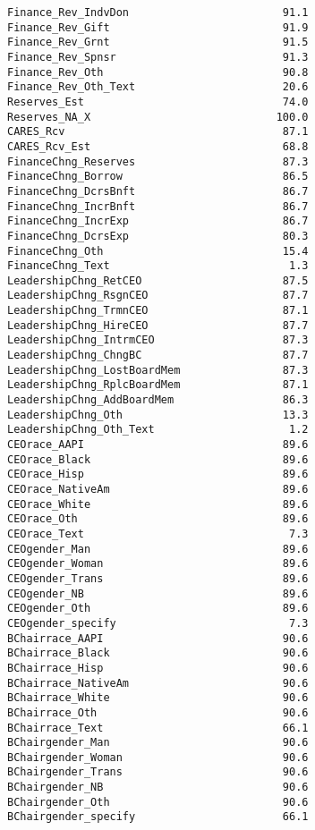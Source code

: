 \documentclass[
  letterpaper,
]{scrbook}
\begin{document}
\begin{verbatim}
Finance_Rev_IndvDon                        91.1
Finance_Rev_Gift                           91.9
Finance_Rev_Grnt                           91.5
Finance_Rev_Spnsr                          91.3
Finance_Rev_Oth                            90.8
Finance_Rev_Oth_Text                       20.6
Reserves_Est                               74.0
Reserves_NA_X                             100.0
CARES_Rcv                                  87.1
CARES_Rcv_Est                              68.8
FinanceChng_Reserves                       87.3
FinanceChng_Borrow                         86.5
FinanceChng_DcrsBnft                       86.7
FinanceChng_IncrBnft                       86.7
FinanceChng_IncrExp                        86.7
FinanceChng_DcrsExp                        80.3
FinanceChng_Oth                            15.4
FinanceChng_Text                            1.3
LeadershipChng_RetCEO                      87.5
LeadershipChng_RsgnCEO                     87.7
LeadershipChng_TrmnCEO                     87.1
LeadershipChng_HireCEO                     87.7
LeadershipChng_IntrmCEO                    87.3
LeadershipChng_ChngBC                      87.7
LeadershipChng_LostBoardMem                87.3
LeadershipChng_RplcBoardMem                87.1
LeadershipChng_AddBoardMem                 86.3
LeadershipChng_Oth                         13.3
LeadershipChng_Oth_Text                     1.2
CEOrace_AAPI                               89.6
CEOrace_Black                              89.6
CEOrace_Hisp                               89.6
CEOrace_NativeAm                           89.6
CEOrace_White                              89.6
CEOrace_Oth                                89.6
CEOrace_Text                                7.3
CEOgender_Man                              89.6
CEOgender_Woman                            89.6
CEOgender_Trans                            89.6
CEOgender_NB                               89.6
CEOgender_Oth                              89.6
CEOgender_specify                           7.3
BChairrace_AAPI                            90.6
BChairrace_Black                           90.6
BChairrace_Hisp                            90.6
BChairrace_NativeAm                        90.6
BChairrace_White                           90.6
BChairrace_Oth                             90.6
BChairrace_Text                            66.1
BChairgender_Man                           90.6
BChairgender_Woman                         90.6
BChairgender_Trans                         90.6
BChairgender_NB                            90.6
BChairgender_Oth                           90.6
BChairgender_specify                       66.1

\end{verbatim}
\end{document}
